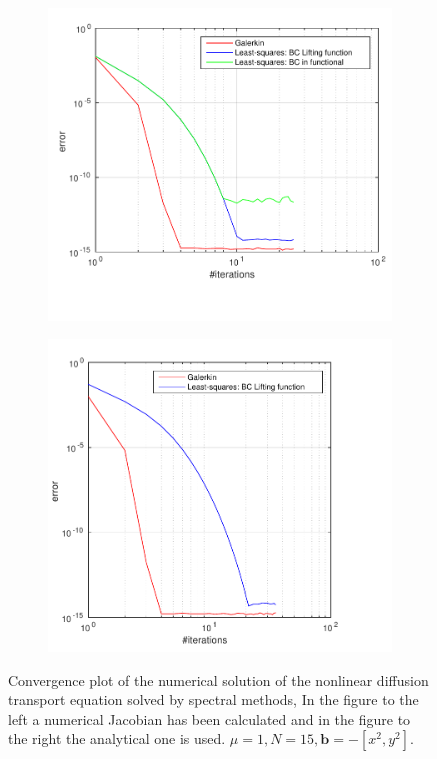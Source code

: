 \begin{figure}[h]
  \centering
  \begin{subfigure}[b]{0.48\textwidth}
	\includegraphics[width=\textwidth]{Figures/Spec_Nonlin_Convergence_Jnum.pdf}
  \end{subfigure}%
  \quad
  \begin{subfigure}[b]{0.48\textwidth}
	\includegraphics[width=\textwidth]{Figures/Spec_Nonlin_Convergence.pdf}
  \end{subfigure}%
  \vspace{-0.1\baselineskip}
	\caption{Convergence plot of the numerical solution of the nonlinear diffusion transport equation solved by spectral methods, In the figure to the left a numerical Jacobian has been calculated and in the figure to the right the analytical one is used. $\mu = 1,N=15,\mathbf{b} = -[x^2,y^2]$.}
  \label{fig:convergenceNonlinear}
\end{figure}
%
